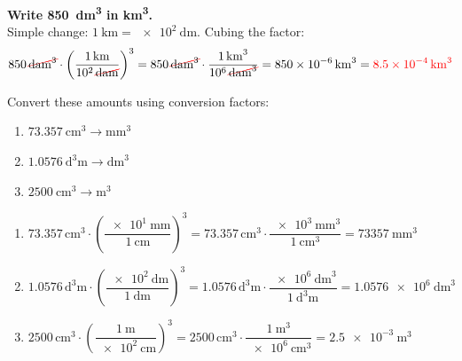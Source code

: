\begin{example}
    \textbf{Write \qty{850}{\cubic\deca\metre} in \unit{\cubic\km}.} \\
    Simple change: \(\qty{1}{\km} = \qty{e2}{\deca\m}\). Cubing the factor:
    \begin{equation*}
        \num{850}\,\cancelunit{\cubic\deca\m} \cdot \left(\dfrac{\qty{1}{\km}}{\num{e2}\,\cancelunit{\deca\m}}\right)^{3}
        = \num{850}\,\cancelunit{\cubic\deca\m} \cdot \dfrac{\qty{1}{\cubic\km}}{\num{e6}\,\cancelunit{\cubic\deca\m}}
        = \qty{850e-6}{\cubic\km} = \textcolor{red}{\qty{8.5e-4}{\cubic\km}}
    \end{equation*}
\end{example}

\begin{exercise}
    Convert these amounts using conversion factors:
    \begin{enumerate}[label=\letraminuscula]
        \item \(\qty{73.357}{\cubic\cm} \to \unit{\cubic\mm}\)
        \item \(\qty{1.0576}{\cubic\deca\metre} \to \unit{\cubic\dm}\)
        \item \(\qty{2500}{\cubic\cm} \to \unit{\cubic\m}\)
    \end{enumerate}
    \begin{solu}
        \begin{enumerate}[label=\alph*)]
            \item \(\num{73.357}\,\unit{\cubic\cm} \cdot \left(\dfrac{\qty{e1}{\mm}}{\qty{1}{\cm}}\right)^{3} = \num{73.357}\,\unit{\cubic\cm} \cdot \dfrac{\qty{e3}{\cubic\mm}}{\qty{1}{\cubic\cm}} = \qty{73357}{\cubic\mm}\)
            \item \(\num{1.0576}\,\unit{\cubic\deca\m} \cdot \left(\dfrac{\qty{e2}{\dm}}{\qty{1}{\deca\m}}\right)^{3} = \num{1.0576}\,\unit{\cubic\deca\m} \cdot \dfrac{\qty{e6}{\cubic\dm}}{\qty{1}{\cubic\deca\m}} = \qty{1.0576e6}{\cubic\dm}\)
            \item \(\num{2500}\,\unit{\cubic\cm} \cdot \left(\dfrac{\qty{1}{\m}}{\qty{e2}{\cm}}\right)^{3} = \num{2500}\,\unit{\cubic\cm} \cdot \dfrac{\qty{1}{\cubic\m}}{\qty{e6}{\cubic\cm}} = \qty{2.5e-3}{\cubic\m}\)
        \end{enumerate}
    \end{solu}
\end{exercise}

